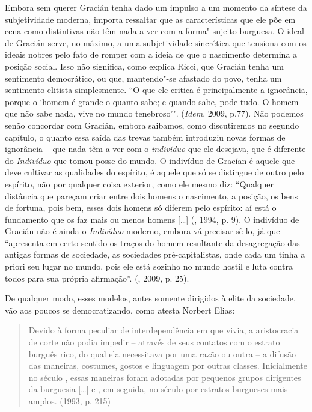 Embora sem querer Gracián tenha dado um impulso a um momento da síntese
da subjetividade moderna, importa ressaltar que as características que
ele põe em cena como distintivas não têm nada a ver com a forma"-sujeito
burguesa. O ideal de Gracián serve, no máximo, a uma subjetividade
sincrética que tensiona com os ideais nobres pelo fato de romper com a
ideia de que o nascimento determina a posição social. Isso não
significa, como explica Ricci, que Gracián tenha um sentimento
democrático, ou que, mantendo"-se afastado do povo, tenha um sentimento
elitista simplesmente. ``O que ele critica é principalmente a
ignorância, porque o `homem é grande o quanto sabe; e quando sabe, pode
tudo. O homem que não sabe nada, vive no mundo tenebroso'".
(\emph{Idem}, 2009, p.77). Não podemos senão concordar com Gracián,
embora saibamos, como discutiremos no segundo capítulo, o quanto essa
saída das trevas também introduziu novas formas de ignorância -- que
nada têm a ver com o \emph{indivíduo} que ele desejava, que é diferente
do \emph{Indivíduo} que tomou posse do mundo. O indivíduo de Gracían é
aquele que deve cultivar as qualidades do espírito, é aquele que só se
distingue de outro pelo espírito, não por qualquer coisa exterior, como
ele mesmo diz: ``Qualquer distância que pareçam criar entre dois homens
o nascimento, a posição, os bens de fortuna, pois bem, esses dois homens
só diferem pelo espírito: aí está o fundamento que os faz mais ou menos
homens [\ldots{}] (, 1994, p. 9). O indivíduo de Gracián não
é ainda o \emph{Indivíduo} moderno, embora vá precisar sê-lo, já que
``apresenta em certo sentido os traços do homem resultante da
desagregação das antigas formas de sociedade, as sociedades
pré-capitalistas, onde cada um tinha a priori seu lugar no mundo, pois
ele está sozinho no mundo hostil e luta contra todos para sua própria
afirmação''. (, 2009, p. 25).

De qualquer modo, esses modelos, antes somente dirigidos à elite da
sociedade, vão aos poucos se democratizando, como atesta Norbert Elias:

\begin{quote}
Devido à forma peculiar de interdependência em que vivia, a aristocracia
de corte não podia impedir -- através de seus contatos com o estrato
burguês rico, do qual ela necessitava por uma razão ou outra -- a
difusão das maneiras, costumes, gostos e linguagem por outras classes.
Inicialmente no século , essas maneiras foram adotadas por pequenos
grupos dirigentes da burguesia [\ldots{}] e , em seguida, no século
 por estratos burgueses mais amplos. (1993, p. 215)
\end{quote}

